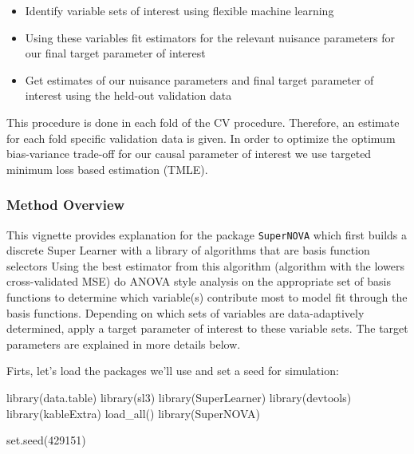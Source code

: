 \documentclass[
]{article}
\newenvironment{Shaded}{\begin{snugshade}}{\end{snugshade}}
\newcommand{\DecValTok}[1]{\textcolor[rgb]{0.00,0.00,0.81}{#1}}
\newcommand{\FunctionTok}[1]{\textcolor[rgb]{0.00,0.00,0.00}{#1}}
\newcommand{\NormalTok}[1]{#1}
\providecommand{\tightlist}{%
  \setlength{\itemsep}{0pt}\setlength{\parskip}{0pt}}
\begin{document}
\begin{itemize}
\tightlist
\item
  Identify variable sets of interest using flexible machine learning
\item
  Using these variables fit estimators for the relevant nuisance
  parameters for our final target parameter of interest
\item
  Get estimates of our nuisance parameters and final target parameter of
  interest using the held-out validation data
\end{itemize}

This procedure is done in each fold of the CV procedure. Therefore, an
estimate for each fold specific validation data is given. In order to
optimize the optimum bias-variance trade-off for our causal parameter of
interest we use targeted minimum loss based estimation (TMLE).

\hypertarget{method-overview}{%
\subsubsection{Method Overview}\label{method-overview}}

This vignette provides explanation for the package \texttt{SuperNOVA}
which first builds a discrete Super Learner with a library of algorithms
that are basis function selectors Using the best estimator from this
algorithm (algorithm with the lowers cross-validated MSE) do ANOVA style
analysis on the appropriate set of basis functions to determine which
variable(s) contribute most to model fit through the basis functions.
Depending on which sets of variables are data-adaptively determined,
apply a target parameter of interest to these variable sets. The target
parameters are explained in more details below.

Firts, let's load the packages we'll use and set a seed for simulation:

\begin{Shaded}
\begin{Highlighting}[]
\FunctionTok{library}\NormalTok{(data.table)}
\FunctionTok{library}\NormalTok{(sl3)}
\FunctionTok{library}\NormalTok{(SuperLearner)}
\FunctionTok{library}\NormalTok{(devtools)}
\FunctionTok{library}\NormalTok{(kableExtra)}
\FunctionTok{load\_all}\NormalTok{()}
\FunctionTok{library}\NormalTok{(SuperNOVA)}

\FunctionTok{set.seed}\NormalTok{(}\DecValTok{429151}\NormalTok{)}
\end{Highlighting}
\end{Shaded}
\end{document}
